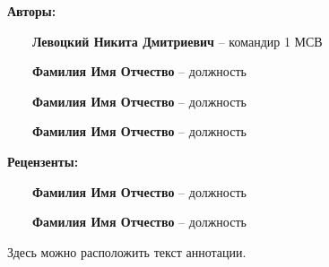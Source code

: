\documentclass[12pt, a4paper]{book}%
\begin{document}
{\large%
\begin{flushleft}%
   {\bf\color{red} Авторы:}%


   ~~~~{\bf Левоцкий Никита Дмитриевич} -- командир 1 МСВ


   ~~~~{\bf Фамилия Имя Отчество} -- должность

   ~~~~{\bf Фамилия Имя Отчество} -- должность

   ~~~~{\bf Фамилия Имя Отчество} -- должность


   \vspace{10mm}%

   {\bf\color{red}Рецензенты:}%

   ~~~~{\bf Фамилия Имя Отчество} -- должность

   ~~~~{\bf Фамилия Имя Отчество} -- должность
\end{flushleft}%

\vspace{10mm}%

Здесь можно расположить текст аннотации.


\newpage%



}
\end{document}
